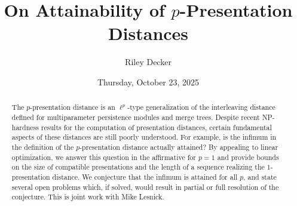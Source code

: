 \documentclass{UAmathtalk}
\author{Riley Decker}
\title{On Attainability of $p$-Presentation Distances}
\date{Thursday, October 23, 2025}
\begin{document}
\maketitle

\begin{abstract}
The $p$-presentation distance is an $\ell^p$-type generalization of the interleaving distance defined for multiparameter persistence modules and merge trees. Despite recent NP-hardness results for the computation of presentation distances, certain fundamental aspects of these distances are still poorly understood. For example, is the infimum in the definition of the \mbox{$p$-presentation} distance actually attained? By appealing to linear optimization, we answer this question in the affirmative for $p=1$ and provide bounds on the size of compatible presentations and the length of a sequence realizing the \mbox{$1$-presentation} distance. We conjecture that the infimum is attained for all $p$, and state several open problems which, if solved, would result in partial or full resolution of the conjecture. This is joint work with Mike Lesnick.
\end{abstract}
\end{document}
